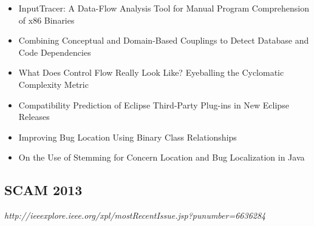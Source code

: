{\begin{itemize}[itemsep=-1ex]
  \item InputTracer: A Data-Flow Analysis Tool for Manual Program Comprehension of x86 Binaries {\color{blue} \checkmark}{\color{blue} \checkmark}
  \item Combining Conceptual and Domain-Based Couplings to Detect Database and Code Dependencies
  \item What Does Control Flow Really Look Like? Eyeballing the Cyclomatic Complexity Metric {\color{blue} \checkmark}{\color{red} \texttimes}
  \item Compatibility Prediction of Eclipse Third-Party Plug-ins in New Eclipse Releases
  \item Improving Bug Location Using Binary Class Relationships {\color{blue} \checkmark}{\color{red} \texttimes}
  \item On the Use of Stemming for Concern Location and Bug Localization in Java
\end{itemize}
}

\subsection{SCAM 2013}

{\small \em http://ieeexplore.ieee.org/xpl/mostRecentIssue.jsp?punumber=6636284}

